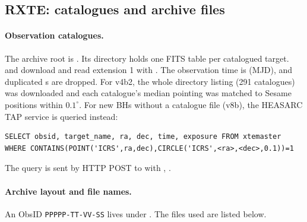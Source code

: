 \subsection{RXTE: catalogues and archive files}\label{sec:get-rxte}
\paragraph{Observation catalogues.}
The archive root is . Its  directory
holds one FITS table per catalogued target.  and  download
 and read extension 1 with . The observation time is
 (MJD), and duplicated s are dropped. For v4b2, the whole directory listing
(291 catalogues) was downloaded and each catalogue's median pointing was matched to Sesame positions within $0.1^\circ$.
For new BHs without a catalogue file (v8b), the HEASARC TAP service is queried instead:
\begin{verbatim}
SELECT obsid, target_name, ra, dec, time, exposure FROM xtemaster
WHERE CONTAINS(POINT('ICRS',ra,dec),CIRCLE('ICRS',<ra>,<dec>,0.1))=1
\end{verbatim}
The query is sent by HTTP POST to  with ,
.

\paragraph{Archive layout and file names.} An ObsID \texttt{PPPPP-TT-VV-SS} lives under
. The files used are listed below.

